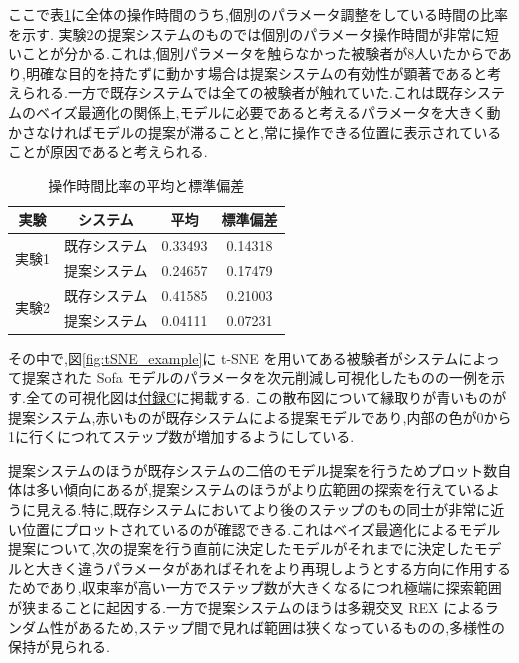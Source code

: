 ここで表\ref{tb:paramTimeComp}に全体の操作時間のうち,個別のパラメータ調整をしている時間の比率を示す.
実験2の提案システムのものでは個別のパラメータ操作時間が非常に短いことが分かる.これは,個別パラメータを触らなかった被験者が8人いたからであり,明確な目的を持たずに動かす場合は提案システムの有効性が顕著であると考えられる.一方で既存システムでは全ての被験者が触れていた.これは既存システムのベイズ最適化の関係上,モデルに必要であると考えるパラメータを大きく動かさなければモデルの提案が滞ることと,常に操作できる位置に表示されていることが原因であると考えられる.
\begin{table}[h]
	\centering
	\caption{操作時間比率の平均と標準偏差\label{tb:paramTimeComp}}
		\begin{tabular}{|c|c|c|c|} \hline
                実験&システム&平均&標準偏差\\ \hline\hline
                \multirow{2}{*}{実験1}&既存システム&0.33493&0.14318 \\ \cline{2-4}
                &提案システム&0.24657& 0.17479 \\ \hline
                \multirow{2}{*}{実験2}&既存システム&0.41585&0.21003 \\ \cline{2-4}
                &提案システム&0.04111&0.07231 \\ \hline
		\end{tabular}
\end{table}
\newpage

その中で,図\ref{fig:tSNE_example}に t-SNE\cite{van2008visualizing} を用いてある被験者がシステムによって提案された Sofa モデルのパラメータを次元削減し可視化したものの一例を示す.全ての可視化図は\hyperref[appendix:tSNE]{付録C}に掲載する.
この散布図について縁取りが青いものが提案システム,赤いものが既存システムによる提案モデルであり,内部の色が0から1に行くにつれてステップ数が増加するようにしている.


提案システムのほうが既存システムの二倍のモデル提案を行うためプロット数自体は多い傾向にあるが,提案システムのほうがより広範囲の探索を行えているように見える.特に,既存システムにおいてより後のステップのもの同士が非常に近い位置にプロットされているのが確認できる.これはベイズ最適化によるモデル提案について,次の提案を行う直前に決定したモデルがそれまでに決定したモデルと大きく違うパラメータがあればそれをより再現しようとする方向に作用するためであり,収束率が高い一方でステップ数が大きくなるにつれ極端に探索範囲が狭まることに起因する.一方で提案システムのほうは多親交叉 REX によるランダム性があるため,ステップ間で見れば範囲は狭くなっているものの,多様性の保持が見られる.

